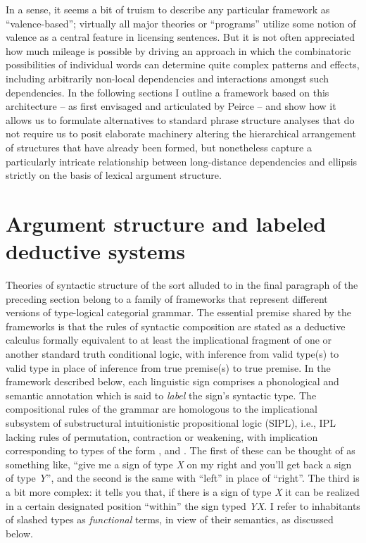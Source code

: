 \documentclass[output=paper,colorlinks,citecolor=brown]{langscibook}
\begin{document}
In a sense, it seems a bit of truism to describe any particular
framework as ``valence-based''; virtually all major theories or
``programs'' utilize some notion of valence as a central feature in
licensing sentences. But it is not often appreciated how much mileage
is possible by driving an approach in which the combinatoric
possibilities of individual words can determine quite complex
patterns and effects, including arbitrarily non-local dependencies and
interactions amongst such dependencies. In the following sections I
outline a framework based on this architecture -- as first envisaged
and articulated by Peirce -- and show how it allows us to formulate
alternatives to standard phrase structure analyses that do not require
us to posit elaborate machinery altering the hierarchical arrangement
of structures that have already been formed, but nonetheless capture a
particularly intricate relationship between long-distance dependencies
and ellipsis strictly on the basis of lexical argument structure.



\section{Argument structure and labeled deductive systems\label{sec:argstruc}}

Theories of syntactic structure of the sort alluded to in the final
paragraph of the preceding section belong to a family of frameworks
that represent different versions of type-logical categorial grammar.
The essential premise shared by the frameworks is that the rules of
syntactic composition are stated as a deductive calculus formally
equivalent to at least the implicational fragment of one or another
standard truth conditional logic, with inference from valid type(s) to
valid type in place of inference from true premise(s) to true
premise. In the framework described below, each linguistic sign
comprises a phonological and semantic annotation which is said to
\emph{label} the sign's syntactic type. The compositional rules of
the grammar are homologous to the implicational subsystem of
substructural intuitionistic propositional logic (SIPL), i.e.,
IPL lacking rules of permutation, contraction or weakening, with implication
corresponding to types of the form , 
 and . The
first of these can be thought of as something like, ``give me a sign of
type \textit{X} on my right and you'll get back a sign of type  \textit{Y}'', and the
second is the same with ``left'' in place of ``right''. The third is a bit
more complex: it tells you that, if there is a sign of type \textit{X} it can be
realized in a certain designated position ``within'' the sign typed
\textit{Y}\vs\textit{X}. I refer to inhabitants of slashed types as
\emph{functional} terms, in view of their semantics, as discussed below.
\end{document}
